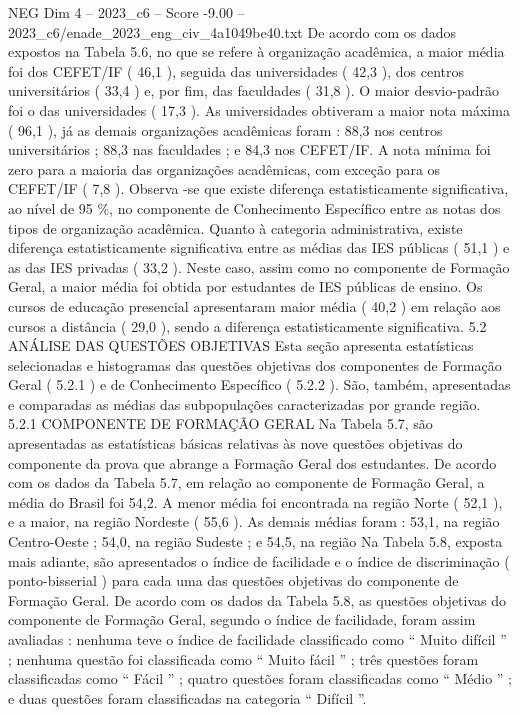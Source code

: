 \begin{textsample}{NEG Dim 4 – 2023\_c6 – Score -9.00 – 2023\_c6/enade\_2023\_eng\_civ\_4a1049be40.txt}
De acordo com os dados expostos na Tabela 5.6, no que se refere à organização acadêmica, a maior média foi dos CEFET/IF ( 46,1 ), seguida das universidades ( 42,3 ), dos centros universitários ( 33,4 ) e, por fim, das faculdades ( 31,8 ).
O maior desvio-padrão foi o das universidades ( 17,3 ).
As universidades obtiveram a maior nota máxima ( 96,1 ), já as demais organizações acadêmicas foram : 88,3 nos centros universitários ; 88,3 nas faculdades ; e 84,3 nos CEFET/IF.
A nota mínima foi zero para a maioria das organizações acadêmicas, com exceção para os CEFET/IF ( 7,8 ).
Observa -se que existe diferença estatisticamente significativa, ao nível de 95 \%, no componente de Conhecimento Específico entre as notas dos tipos de organização acadêmica.
Quanto à categoria administrativa, existe diferença estatisticamente significativa entre as médias das IES públicas ( 51,1 ) e as das IES privadas ( 33,2 ).
Neste caso, assim como no componente de Formação Geral, a maior média foi obtida por estudantes de IES públicas de ensino.
Os cursos de educação presencial apresentaram maior média ( 40,2 ) em relação aos cursos a distância ( 29,0 ), sendo a diferença estatisticamente significativa. 5.2 ANÁLISE DAS QUESTÕES OBJETIVAS Esta seção apresenta estatísticas selecionadas e histogramas das questões objetivas dos componentes de Formação Geral ( 5.2.1 ) e de Conhecimento Específico ( 5.2.2 ).
São, também, apresentadas e comparadas as médias das subpopulações caracterizadas por grande região. 5.2.1 COMPONENTE DE FORMAÇÃO GERAL Na Tabela 5.7, são apresentadas as estatísticas básicas relativas às nove questões objetivas do componente da prova que abrange a Formação Geral dos estudantes.
De acordo com os dados da Tabela 5.7, em relação ao componente de Formação Geral, a média do Brasil foi 54,2.
A menor média foi encontrada na região Norte ( 52,1 ), e a maior, na região Nordeste ( 55,6 ).
As demais médias foram : 53,1, na região Centro-Oeste ; 54,0, na região Sudeste ; e 54,5, na região Na Tabela 5.8, exposta mais adiante, são apresentados o índice de facilidade e o índice de discriminação ( ponto-bisserial ) para cada uma das questões objetivas do componente de Formação Geral.
De acordo com os dados da Tabela 5.8, as questões objetivas do componente de Formação Geral, segundo o índice de facilidade, foram assim avaliadas : nenhuma teve o índice de facilidade classificado como “ Muito difícil ” ; nenhuma questão foi classificada como “ Muito fácil ” ; três questões foram classificadas como “ Fácil ” ; quatro questões foram classificadas como “ Médio ” ; e duas questões foram classificadas na categoria “ Difícil ”.

\end{textsample}
